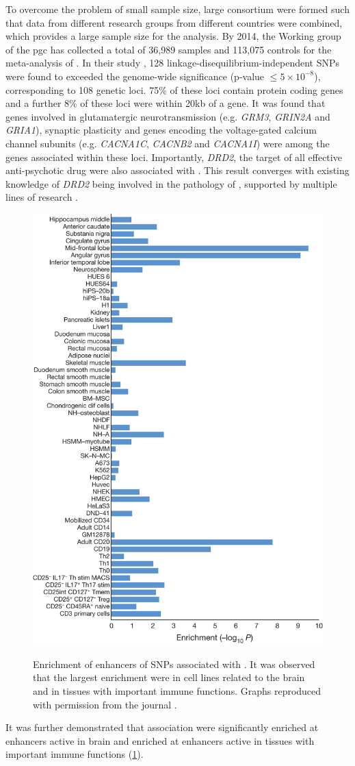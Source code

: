 	To overcome the problem of small sample size, large consortium were formed such that data from different research groups from different countries were combined, which provides a large sample size for the analysis.
	By 2014, the  Working group of the \gls{pgc} has collected a total of 36,989  samples and 113,075 controls for the meta-analysis of  \citep{Ripke2014}.
	In their study \citep{Ripke2014}, 128 linkage-disequilibrium-independent \glspl{SNP} were found to  exceeded the genome-wide significance (p-value $\le 5\times10^{-8}$), corresponding to 108 genetic loci.
	75\% of these loci contain protein coding genes and a further 8\% of these loci were within 20\gls{kb} of a gene. 
	It was found that genes involved in glutamatergic neurotransmission (e.g. \textit{GRM3}, \textit{GRIN2A} and \textit{GRIA1}), synaptic plasticity and genes encoding the voltage-gated calcium channel subunits (e.g. \textit{CACNA1C}, \textit{CACNB2} and \textit{CACNA1I}) were among the genes associated within these loci.
	Importantly, \textit{DRD2}, the target of all effective anti-psychotic drug were also associated with .
	This result converges with existing knowledge of \textit{DRD2} being involved in the pathology of , supported by multiple lines of research \citep{Talkowski2007}.
	\begin{figure}
		\centering
		\caption[Enrichment of enhancers of SNPs associated with Schizophrenia]{Enrichment of enhancers of SNPs associated with . 
			It was observed that the largest enrichment were in cell lines related to the brain and in tissues with important immune functions. 
			Graphs reproduced with permission from the journal \citep{Ripke2014}.}
		\includegraphics[height=\textwidth]{figure/pgc_enrichment_tissue.jpg}
		\label{fig:pgcEnrich}
	\end{figure}
	It was further demonstrated that  association were significantly enriched at enhancers active in brain and enriched at enhancers active in tissues with important immune functions (\cref{fig:pgcEnrich})\citep{Ripke2014}.
	
